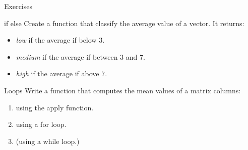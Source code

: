 \documentclass[10pt]{beamer}
\begin{document}
\begin{frame}{Exercises}
  \begin{block}{{\sf if else}}
    Create a function that classify the average value of a {\sf vector}. It returns:
    \begin{itemize}
    \item {\it low} if the average if below $3$.
    \item {\it medium} if the average if between $3$ and $7$.
    \item {\it high} if the average if above $7$.
    \end{itemize}
  \end{block}
  
  \bigskip
  
  \begin{block}{Loops}
    Write a function that computes the mean values of a matrix columns:
    \begin{enumerate}
    \item using the {\sf apply}  function.
    \item using a {\sf for} loop.
    \item (using a {\sf while} loop.)
    \end{enumerate}
  \end{block}
\end{frame}


\end{document}
